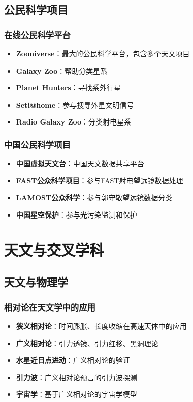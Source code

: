 \documentclass[12pt,UTF8]{ctexbook}
\begin{document}
\chapter{公民科学项目}
\section{在线公民科学平台}

\begin{itemize}
  \item \textbf{Zooniverse}：最大的公民科学平台，包含多个天文项目
  \item \textbf{Galaxy Zoo}：帮助分类星系
  \item \textbf{Planet Hunters}：寻找系外行星
  \item \textbf{Seti@home}：参与搜寻外星文明信号
  \item \textbf{Radio Galaxy Zoo}：分类射电星系
\end{itemize}

\section{中国公民科学项目}

\begin{itemize}
  \item \textbf{中国虚拟天文台}：中国天文数据共享平台
  \item \textbf{FAST公众科学项目}：参与FAST射电望远镜数据处理
  \item \textbf{LAMOST公众科学}：参与郭守敬望远镜数据分类
  \item \textbf{中国星空保护}：参与光污染监测和保护
\end{itemize}

\part{天文与交叉学科}

\chapter{天文与物理学}
\section{相对论在天文学中的应用}

\begin{itemize}
  \item \textbf{狭义相对论}：时间膨胀、长度收缩在高速天体中的应用
  \item \textbf{广义相对论}：引力透镜、引力红移、黑洞理论
  \item \textbf{水星近日点进动}：广义相对论的验证
  \item \textbf{引力波}：广义相对论预言的引力波探测
  \item \textbf{宇宙学}：基于广义相对论的宇宙学模型
\end{itemize}
\end{document}
